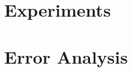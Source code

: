 \documentclass[compress]{beamer}
\begin{document}
\begin{frame}[allowframebreaks]{\secname}
        \end{frame}


\section{Experiments}
\begin{frame}{\secname}
\end{frame}

\section{Error Analysis}
\begin{frame}{\secname}
\end{frame}
\end{document}
